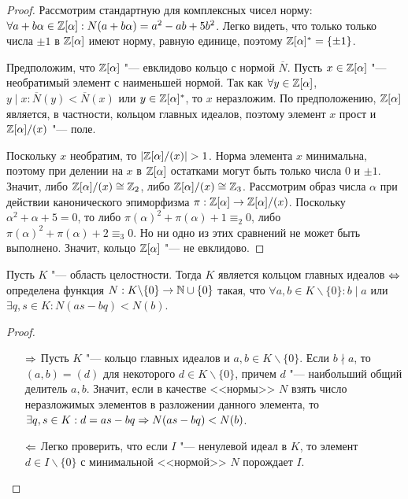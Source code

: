 \begin{proof}
	Рассмотрим стандартную для комплексных чисел норму: $\forall a + b\alpha \hm\in \Z[\alpha]: N(a + b\alpha) \hm= a^2 - ab + 5b^2$. Легко видеть, что только только числа $\pm1$ в $\mathbb{Z}[\alpha]$ имеют норму, равную единице, поэтому $\mathbb{Z}[\alpha]^* = \{\pm1\}$.
		
	Предположим, что $\mathbb{Z}[\alpha]$ "--- евклидово кольцо с нормой $\overline{N}$. Пусть $x \in \mathbb{Z}[\alpha]$ "--- необратимый элемент с наименьшей нормой. Так как $\forall y \in \mathbb{Z}[\alpha]$, $y \mid x: \overline{N}(y) < \overline{N}(x)$ или $y \in \mathbb{Z}[\alpha]^*$, то $x$ неразложим. По предположению, $\mathbb{Z}[\alpha]$ является, в частности, кольцом главных идеалов, поэтому элемент $x$ прост и $\mathbb{Z}[\alpha] / (x)$ "--- поле.
	
	Поскольку $x$ необратим, то $|\mathbb{Z}[\alpha] / (x)| > 1$. Норма элемента $x$ минимальна, поэтому при делении на $x$ в $\mathbb{Z}[\alpha]$ остатками могут быть только числа $0$ и $\pm1$. Значит, либо $\mathbb{Z}[\alpha] / (x) \cong \mathbb{Z}_2$, либо $\mathbb{Z}[\alpha] / (x) \cong \mathbb{Z}_3$. Рассмотрим образ числа $\alpha$ при действии канонического эпиморфизма $\pi: \mathbb{Z}[\alpha] \to \mathbb{Z}[\alpha] / (x)$. Поскольку $\alpha^2 + \alpha + 5 = 0$, то либо $\pi(\alpha)^2 + \pi(\alpha) + 1 \equiv_2 0$, либо $\pi(\alpha)^2 + \pi(\alpha) + 2 \equiv_3 0$. Но ни одно из этих сравнений не может быть выполнено. Значит, кольцо $\mathbb{Z}[\alpha]$ "--- не евклидово.
\end{proof}

\begin{proposition}
	Пусть $K$ "--- область целостности. Тогда $K$ является кольцом главных идеалов $\Leftrightarrow$ определена функция $N: K\backslash\{0\} \to \mathbb{N} \cup \{0\}$ такая, что $\forall a, b \in K\backslash\{0\}: b \mid a$ или $\exists q, s \in K: N(as - bq) < N(b)$.
\end{proposition}

\begin{proof}~
	\begin{itemize}
		\item[$\Rightarrow$] Пусть $K$ "--- кольцо главных идеалов и $a, b \in K\backslash\{0\}$. Если $b \nmid a$, то $(a, b) = (d)$ для некоторого $d \in K\backslash\{0\}$, причем $d$ "--- наибольший общий делитель $a, b$. Значит, если в качестве <<нормы>> $N$ взять число неразложимых элементов в разложении данного элемента, то $\exists q, s \in K: d = as - bq \Rightarrow N(as - bq) < N(b)$.
		\item[$\Leftarrow$] Легко проверить, что если $I$ "--- ненулевой идеал в $K$, то элемент $d \in I \backslash \{0\}$ с минимальной <<нормой>> $N$ порождает $I$.\qedhere
	\end{itemize}
\end{proof}

